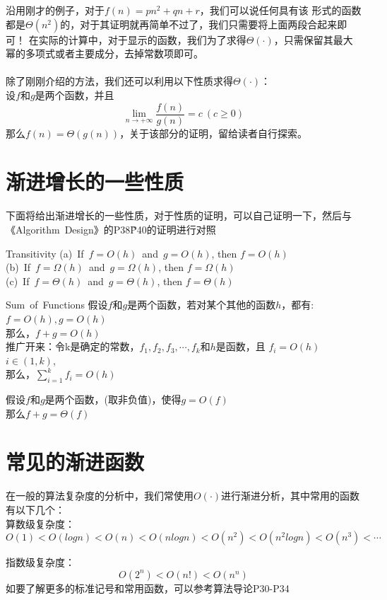 沿用刚才的例子，对于$f(n)=pn^2+qn+r$，我们可以说任何具有该
形式的函数都是$\Theta(n^2)$的，对于其证明就再简单不过了，我们只需要将上面两段合起来即可！
在实际的计算中，对于显示的函数，我们为了求得$\Theta(\cdot)$，只需保留其最大幂的多项式或者主要成分，去掉常数项即可。
\\
\\
除了刚刚介绍的方法，我们还可以利用以下性质求得$\Theta(\cdot)$：
\\
设$f$和$g$是两个函数，并且
\[
   \lim_{n\rightarrow+\infty}\frac{f(n)}{g(n)} = c \ (c\ge 0)
\]
那么$f(n)=\Theta(g(n))$，关于该部分的证明，留给读者自行探索。


\section{渐进增长的一些性质}
下面将给出渐进增长的一些性质，对于性质的证明，可以自己证明一下，然后与《Algorithm\ Design》的P38\~P40的证明进行对照
\begin{theorem}{Transitivity}{}
   (a)\ If\ $f=O(h)$\ and\ $g=O(h)$, then $f=O(h)$\\
   (b)\ If\ $f=\Omega(h)$\ and\ $g=\Omega(h)$, then $f=\Omega(h)$\\
   (c)\ If\ $f=\Theta(h)$\ and\ $g=\Theta(h)$, then $f=\Theta(h)$
\end{theorem}

\begin{theorem}{Sum\ of\ Functions}{}
   假设$f$和$g$是两个函数，若对某个其他的函数$h$，都有:$f=O(h),g=O(h)$\\
   那么，$f+g=O(h)$\\
   推广开来：令k是确定的常数，$f_1,f_2,f_3,\cdots,f_k$和$h$是函数，且
   $f_i=O(h)$ \ \ $i\in (1,k)$,\\
   那么，$\sum^{k}_{i=1}f_i=O(h)$
\end{theorem}

\begin{theorem}{ }{}
   假设$f$和$g$是两个函数，(取非负值)，使得$g = O(f)$\\
   那么$f+g=\Theta(f)$
\end{theorem}

\section{常见的渐进函数}
在一般的算法复杂度的分析中，我们常使用$O(\cdot)$进行渐进分析，其中常用的函数有以下几个：\\
算数级复杂度：
$$
O(1)<O(logn)<O(n)<O(nlogn)<O(n^2)<O(n^2logn)<O(n^3)< \cdots
$$

指数级复杂度：
$$
O(2^n)<O(n!)<O(n^n)
$$
如要了解更多的标准记号和常用函数，可以参考算法导论P30-P34